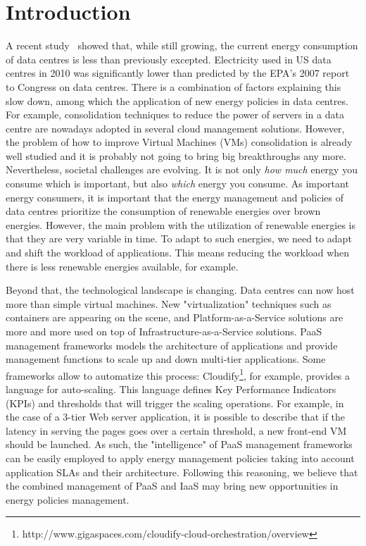 \section{Introduction}
\label{sec: intro}

A recent study~\cite{koomey2011} showed that, while still growing, the current energy consumption of data centres is less than previously excepted.
Electricity used in US data centres in 2010 was significantly lower than predicted by the EPA’s 2007 report to Congress on data centres.
There is a combination of factors explaining this slow down, among which the application of new energy policies in data centres.
For example, consolidation techniques to reduce the power of servers in a data centre are nowadays adopted in several cloud management solutions.
However, the problem of how to improve Virtual Machines (VMs) consolidation is already well studied and it is probably not going to bring big breakthroughs any more.
Nevertheless, societal challenges are evolving.
It is not only \emph{how much} energy you consume which is important, but also \emph{which} energy you consume. 
As important energy consumers, it is important that the energy management and policies of data centres prioritize the consumption of renewable energies over brown energies.
However, the main problem with the utilization of renewable energies is that they are very variable in time.
To adapt to such energies, we need to adapt and shift the workload of applications.
This means reducing the workload when there is less renewable energies available, for example.

Beyond that, the technological landscape is changing.
Data centres can now host more than simple virtual machines.
New "virtualization" techniques such as containers are appearing on the scene, and Platform-as-a-Service solutions are more and more used on top of Infrastructure-as-a-Service solutions.
PaaS management frameworks models the architecture of applications and provide management functions to scale up and down multi-tier applications. 
Some frameworks allow to automatize this process: Cloudify\footnote{http://www.gigaspaces.com/cloudify-cloud-orchestration/overview}, for example, provides a language for auto-scaling.
This language defines Key Performance Indicators (KPIs) and thresholds that will trigger the scaling operations.
For example, in the case of a 3-tier Web server application, it is possible to describe that if the latency in serving the pages goes over a certain threshold, a new front-end VM should be launched.
As such, the "intelligence" of PaaS management frameworks can be easily employed to apply energy management policies taking into account application SLAs and their architecture.
Following this reasoning, we believe that the combined management of PaaS and IaaS may bring new opportunities in energy policies management.

